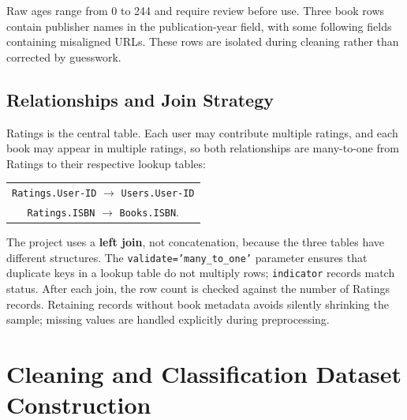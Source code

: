 \documentclass[12pt,a4paper]{article}
\newcommand{\code}[1]{\texttt{#1}}
\begin{document}
Raw ages range from 0 to 244 and require review before use. Three book rows contain publisher names
in the publication-year field, with some following fields containing misaligned URLs. These rows are
isolated during cleaning rather than corrected by guesswork.

\subsection{Relationships and Join Strategy}
Ratings is the central table. Each user may contribute multiple ratings, and each book may appear in
multiple ratings, so both relationships are many-to-one from Ratings to their respective lookup tables:
\begin{center}
\begin{tabular}{c}
\code{Ratings.User-ID} $\longrightarrow$ \code{Users.User-ID}\\[2pt]
\code{Ratings.ISBN} $\longrightarrow$ \code{Books.ISBN}.
\end{tabular}
\end{center}
The project uses a \textbf{left join}, not concatenation, because the three tables have different
structures. The \code{validate='many\_to\_one'} parameter ensures that duplicate keys in a lookup
table do not multiply rows; \code{indicator} records match status. After each join, the row count is
checked against the number of Ratings records. Retaining records without book metadata avoids
silently shrinking the sample; missing values are handled explicitly during preprocessing.
\FloatBarrier

\section{Cleaning and Classification Dataset Construction}
\end{document}
